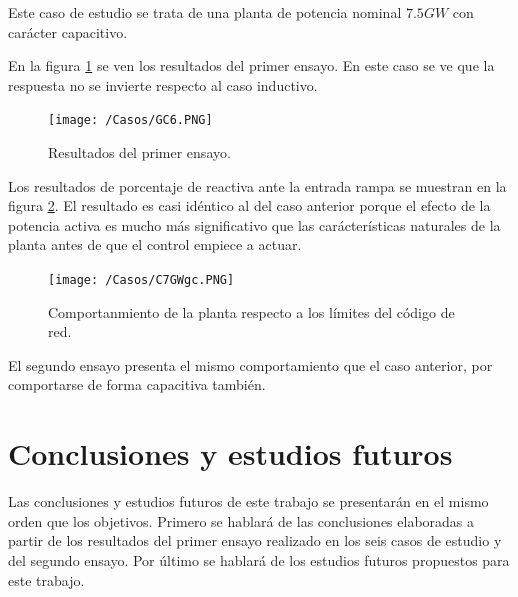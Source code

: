 \documentclass{book}
\begin{document}
Este caso de estudio se trata de una planta de potencia nominal $7.5GW$ con car\'acter capacitivo. \par

En la figura \ref{GC6} se ven los resultados del primer ensayo. En este caso se ve que la respuesta no se invierte respecto al caso inductivo.   \par

\begin{figure}[h!]
\centering
\texttt{[image: /Casos/GC6.PNG]}
\caption{Resultados del primer ensayo. }
\label{GC6}
\end{figure} \par

Los resultados de porcentaje de reactiva ante la entrada rampa se muestran en la figura \ref{C7GWgc}. El resultado es casi id\'entico al del caso anterior porque el efecto de la potencia activa es mucho m\'as significativo que las car\'acter\'isticas naturales de la planta antes de que el control empiece a actuar. \par

\begin{figure}[h!]
\centering
\texttt{[image: /Casos/C7GWgc.PNG]}
\caption{Comportanmiento de la planta respecto a los l\'imites del c\'odigo de red. }
\label{C7GWgc}
\end{figure} \par

El segundo ensayo presenta el mismo comportamiento que el caso anterior, por comportarse de forma capacitiva tambi\'en. \par

\chapter{Conclusiones y estudios futuros}

Las conclusiones y estudios futuros de este trabajo se presentar\'an en el mismo orden que los objetivos. Primero se hablar\'a de las conclusiones elaboradas a partir de los resultados del primer ensayo realizado en los seis casos de estudio y del segundo ensayo. Por \'ultimo se hablar\'a de los estudios futuros propuestos para este trabajo.  \par
\end{document}
